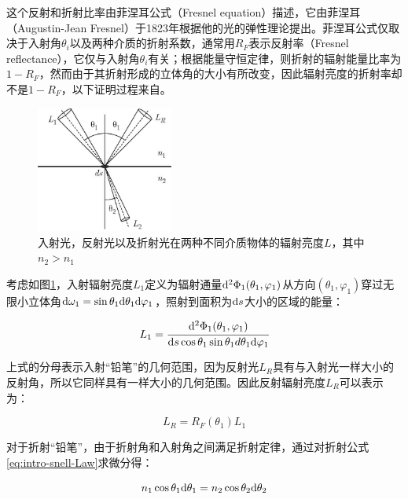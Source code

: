 这个反射和折射比率由菲涅耳公式（Fresnel equation）描述，它由菲涅耳（Augustin-Jean Fresnel）于1823年根据他的光的弹性理论提出。菲涅耳公式仅取决于入射角$\theta_i$以及两种介质的折射系数，通常用$R_F$表示反射率（Fresnel reflectance），它仅与入射角$\theta_i$有关；根据能量守恒定律，则折射的辐射能量比率为$1-R_F$，然而由于其折射形成的立体角的大小有所改变，因此辐射亮度的折射率却不是$1-R_F$，以下证明过程来自\cite{a:ReflectionandtransmissionoflightbyaflatinterfaceFresnelsformulae}。

\begin{figure}
	\sidecaption
	\includegraphics[width=0.4\textwidth]{figures/intro/fresnel}
	\caption{入射光，反射光以及折射光在两种不同介质物体的辐射亮度$L$，其中$n_2>n_1$}
	\label{f:intro-fresnel}
\end{figure}

考虑如图\ref{f:intro-fresnel}，入射辐射亮度$L_1$定义为辐射通量${\rm d}^{2}\Phi_1(\theta_1,\varphi_1)$从方向$(\theta_1,\varphi_1)$穿过无限小立体角${\rm d}\omega_1=\sin\theta_1 {\rm d}\theta_1 {\rm d}\varphi_1$，照射到面积为${\rm d}s$大小的区域的能量：

\begin{equation}
	L_1= \cfrac{{\rm d}^{2}\Phi_1(\theta_1,\varphi_1)}{{\rm d}s\cos\theta_1 \sin\theta_1 d\theta_1 {\rm d}\varphi_1}
\end{equation}

\noindent 上式的分母表示入射“铅笔”的几何范围，因为反射光$L_R$具有与入射光一样大小的反射角，所以它同样具有一样大小的几何范围。因此反射辐射亮度$L_R$可以表示为：

 \begin{equation}
 	L_R=R_F(\theta_1)L_1
 \end{equation}

\noindent 对于折射“铅笔”，由于折射角和入射角之间满足折射定律，通过对折射公式\ref{eq:intro-snell-Law}求微分得：

\begin{equation}\label{eq:intro-snell-Law-diff}
	n_1 \cos\theta_1 {\rm d}\theta_1=n_2 \cos\theta_2 {\rm d}\theta_2
\end{equation}

